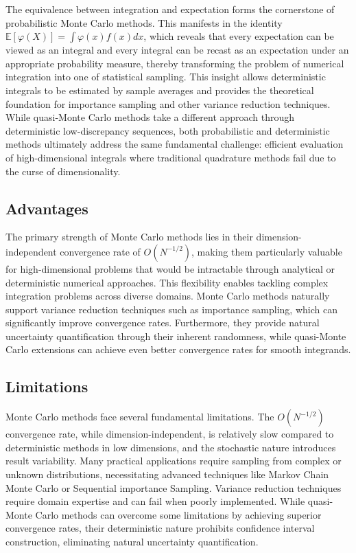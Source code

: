 The equivalence between integration and expectation forms the cornerstone of probabilistic Monte Carlo methods. This manifests in the identity $\mathbb{E}[\varphi(X)] = \int \varphi(x)f(x)dx$, which reveals that every expectation can be viewed as an integral and every integral can be recast as an expectation under an appropriate probability measure, thereby transforming the problem of numerical integration into one of statistical sampling. This insight allows deterministic integrals to be estimated by sample averages and provides the theoretical foundation for importance sampling and other variance reduction techniques. While quasi-Monte Carlo methods take a different approach through deterministic low-discrepancy sequences, both probabilistic and deterministic methods ultimately address the same fundamental challenge: efficient evaluation of high-dimensional integrals where traditional quadrature methods fail due to the curse of dimensionality.

\subsection{Advantages}
The primary strength of Monte Carlo methods lies in their dimension-independent convergence rate of $O(N^{-1/2})$, making them particularly valuable for high-dimensional problems that would be intractable through analytical or deterministic numerical approaches. This flexibility enables tackling complex integration problems across diverse domains. Monte Carlo methods naturally support variance reduction techniques such as importance sampling, which can significantly improve convergence rates. Furthermore, they provide natural uncertainty quantification through their inherent randomness, while quasi-Monte Carlo extensions can achieve even better convergence rates for smooth integrands.

\subsection{Limitations}
Monte Carlo methods face several fundamental limitations. The $O(N^{-1/2})$ convergence rate, while dimension-independent, is relatively slow compared to deterministic methods in low dimensions, and the stochastic nature introduces result variability. Many practical applications require sampling from complex or unknown distributions, necessitating advanced techniques like Markov Chain Monte Carlo or Sequential importance Sampling. Variance reduction techniques require domain expertise and can fail when poorly implemented. While quasi-Monte Carlo methods can overcome some limitations by achieving superior convergence rates, their deterministic nature prohibits confidence interval construction, eliminating natural uncertainty quantification.


